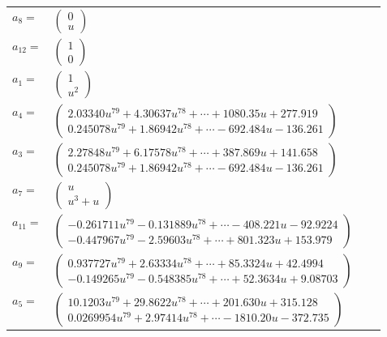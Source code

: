 \documentclass[1p]{elsarticle_modified}
\theoremstyle{definition}
\begin{document}
\begin{tabular}{m{7pt} m{180pt} m{7pt} m{180pt} }
\flushright $a_{8}=$&$\begin{pmatrix}0\\u\end{pmatrix}$ \\
\flushright $a_{12}=$&$\begin{pmatrix}1\\0\end{pmatrix}$ \\
\flushright $a_{1}=$&$\begin{pmatrix}1\\u^2\end{pmatrix}$ \\
\flushright $a_{4}=$&$\begin{pmatrix}2.03340 u^{79}+4.30637 u^{78}+\cdots+1080.35 u+277.919\\0.245078 u^{79}+1.86942 u^{78}+\cdots-692.484 u-136.261\end{pmatrix}$ \\
\flushright $a_{3}=$&$\begin{pmatrix}2.27848 u^{79}+6.17578 u^{78}+\cdots+387.869 u+141.658\\0.245078 u^{79}+1.86942 u^{78}+\cdots-692.484 u-136.261\end{pmatrix}$ \\
\flushright $a_{7}=$&$\begin{pmatrix}u\\u^3+u\end{pmatrix}$ \\
\flushright $a_{11}=$&$\begin{pmatrix}-0.261711 u^{79}-0.131889 u^{78}+\cdots-408.221 u-92.9224\\-0.447967 u^{79}-2.59603 u^{78}+\cdots+801.323 u+153.979\end{pmatrix}$ \\
\flushright $a_{9}=$&$\begin{pmatrix}0.937727 u^{79}+2.63334 u^{78}+\cdots+85.3324 u+42.4994\\-0.149265 u^{79}-0.548385 u^{78}+\cdots+52.3634 u+9.08703\end{pmatrix}$ \\
\flushright $a_{5}=$&$\begin{pmatrix}10.1203 u^{79}+29.8622 u^{78}+\cdots+201.630 u+315.128\\0.0269954 u^{79}+2.97414 u^{78}+\cdots-1810.20 u-372.735\end{pmatrix}$ \\

\end{tabular}
\end{document}
